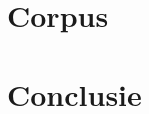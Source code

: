 \documentclass[pdftex,a4paper,12pt,twoside]{report}
\begin{document}


\chapter{Corpus}
\label{ch:corpus}


\chapter{Conclusie}
\label{ch:conclusie}








\listoffigures
\listoftables
\end{document}

